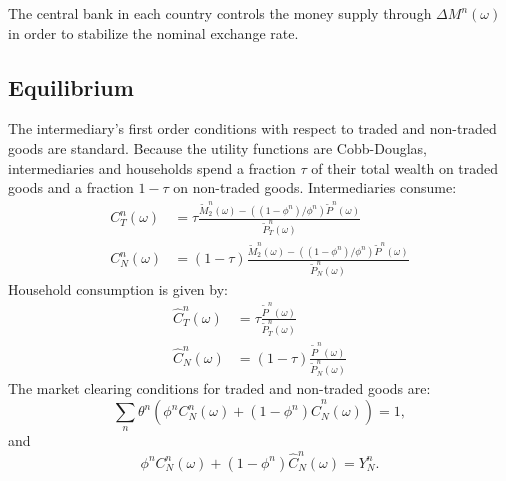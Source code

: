 \documentclass[12pt]{article}
\begin{document}
The central bank in each country controls the money supply through
$\Delta M^n(\omega)$ in order to stabilize the nominal exchange rate.

\subsection*{Equilibrium}

The intermediary's first order conditions with respect to traded and
non-traded goods are standard. Because the utility functions are
Cobb-Douglas, intermediaries and households spend a fraction $\tau$ of
their total wealth on traded goods and a fraction $1 - \tau$ on
non-traded goods. Intermediaries consume:
\begin{align}
  C^n_T(\omega)
  & = \tau \frac{
    \tilde{M}^n_2(\omega) - ((1 - \phi^n) / \phi^n) \tilde{P}^n(\omega)
    }{\tilde{P}^n_T(\omega)}  \\
  C^n_N(\omega)
  & = (1 - \tau) \frac{
    \tilde{M}^n_2(\omega) - ((1 - \phi^n) / \phi^n) \tilde{P}^n(\omega)
    }{\tilde{P}^n_N(\omega)}
\end{align}
Household consumption is given by:
\begin{align}
  \hat{C}^n_T(\omega)
  & = \tau \frac{\tilde{P}^n(\omega)}{\tilde{P}^n_T(\omega)}  \\
  \hat{C}^n_N(\omega)
  & = (1 - \tau) \frac{\tilde{P}^n(\omega)}{\tilde{P}^n_N(\omega)}
\end{align}
The market clearing conditions for traded and non-traded goods are:
\begin{equation}
  \sum_n \theta^n \left( \phi^n C^n_N(\omega) + (1 - \phi^n) \hat{C}^n_N(\omega)  \right) = 1,
\end{equation}
and
\begin{equation}
  \phi^n C^n_N(\omega) + (1 - \phi^n) \hat{C}^n_N(\omega) = Y^n_N.
\end{equation}
\end{document}
